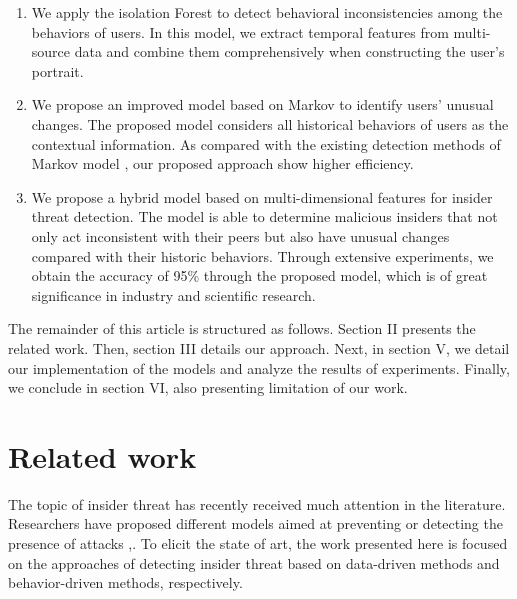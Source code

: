 \documentclass[conference]{IEEEtran}
\begin{document}
\begin{enumerate}
\item 
We apply the isolation Forest to detect behavioral inconsistencies among the behaviors of users. In this model, we extract temporal features from multi-source data and combine them comprehensively when constructing the user's portrait.

\item We propose an improved model based on Markov to identify users' unusual changes. The proposed model considers all historical behaviors of users as the contextual information. As compared with the existing detection methods of Markov model \cite{b7}, our proposed approach show higher efficiency.


\item We propose a hybrid model based on multi-dimensional features for insider threat detection. The model is able to determine malicious insiders that not only act inconsistent with their peers but also have unusual changes compared with their historic behaviors. 
Through extensive experiments, we obtain the accuracy of 95\% through the proposed model, which is of great significance in industry and scientific research.
 


\end{enumerate}

The remainder of this article is structured as follows. 
Section II presents the related work.
Then, section III details our approach. Next, in section V, 
we detail our implementation of the models and analyze the results of experiments. 
Finally, we conclude in section VI, also presenting limitation of our work.




\section{Related work}
The topic of insider threat has recently received much attention in the literature. Researchers have proposed different models aimed at preventing or detecting the presence of attacks  \cite{b11},\cite{b12}. To elicit the state of art, the work
presented here is focused on the approaches of detecting insider threat based on data-driven methods and behavior-driven methods, respectively.
\end{document}
